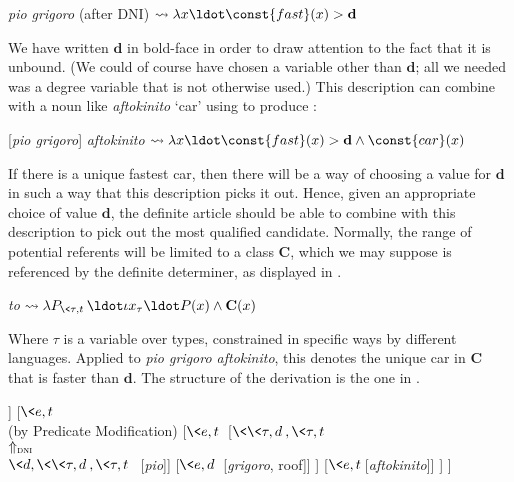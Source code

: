\documentclass[output=paper
,modfonts
,nonflat]{langsci/langscibook}
\begin{document}
\ea \label{ex:coppockstrand:81}
\textit{pio grigoro}  (after DNI) $\leadsto \lambda x \ldot \const{fast}(x) > \textbf{d}$ 
\z 

We have written $\textbf{d}$ in bold-face in order to draw attention to the fact that it is unbound. (We could of course have chosen a variable other than $\textbf{d}$; all we needed was a degree variable that is not otherwise used.)  This description can combine with a noun like \textit{aftokinito} `car' using  to produce :

\ea \label{ex:coppockstrand:82}
[\textit{pio grigoro}] \textit{aftokinito} $\leadsto \lambda x \ldot \const{fast}(x) > \textbf{d} \land \const{car}(x)$ 
\z 

If there is a unique fastest car, then there will be a way of choosing a value for $\textbf{d}$ in such a way that this description picks it out. Hence, given an appropriate choice of value $\textbf{d}$, the definite article should be able to combine with this description to pick out the most qualified candidate. Normally, the range of potential referents will be limited to a class $\textbf{C}$, which we may suppose is referenced by the definite determiner, as displayed in .


\ea \label{ex:coppockstrand:83}
\textit{to} $\leadsto \lambda P_{\<\tau,t\>} \ldot \iota x_\tau \ldot P(x) \land \textbf{C}(x)$
\z 

Where $\tau$ is a variable over types, constrained in specific ways by different languages.
Applied to \textit{pio grigoro aftokinito}, this denotes the unique car in $\textbf{C}$ that is faster than $\textbf{d}$. The structure of the derivation is the one in .

\ea{}  \label{ex:coppockstrand:84}
\begin{forest}
	[$e$
		[{$\<\<\tau,t\>,\tau\>$}[\textit{to}]]
		[{$\<e,t\>$\\(by Predicate Modification)}
			[{$\<e,t\>$}
				[{$\<\<\tau,d\>,\<\tau,t\>\>$\\$\Uparrow_{\textsc{dni}}$\\$\<d,\<\<\tau,d\>,\<\tau,t\>\>$} [\textit{pio}]]
				[{$\<e,d\>$} [\textit{grigoro}, roof]]
			]
			[{$\<e,t\>$}[\textit{aftokinito}]]
		]
	]
\end{forest}
\z 
\end{document}
